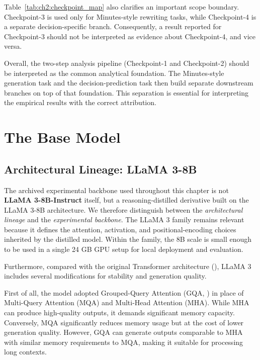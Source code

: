 Table~\ref{tab:ch2:checkpoint_map} also clarifies an important scope boundary. Checkpoint-3 is used only for Minutes-style rewriting tasks, while Checkpoint-4 is a separate decision-specific branch. Consequently, a result reported for Checkpoint-3 should not be interpreted as evidence about Checkpoint-4, and vice versa.

Overall, the two-step analysis pipeline (Checkpoint-1 and Checkpoint-2) should be interpreted as the common analytical foundation. The Minutes-style generation task and the decision-prediction task then build separate downstream branches on top of that foundation. This separation is essential for interpreting the empirical results with the correct attribution.








\section{The Base Model}\label{ch2:sec:base_model}



\subsection*{Architectural Lineage: LLaMA 3-8B}
The archived experimental backbone used throughout this chapter is not \textbf{LLaMA 3-8B-Instruct} itself, but a reasoning-distilled derivative built on the LLaMA 3-8B architecture. We therefore distinguish between the \textit{architectural lineage} and the \textit{experimental backbone}. The LLaMA 3 family remains relevant because it defines the attention, activation, and positional-encoding choices inherited by the distilled model. Within the family, the 8B scale is small enough to be used in a single 24 GB GPU setup for local deployment and evaluation.


Furthermore, compared with the original Transformer architecture (\cite{vaswani-etal2018}), LLaMA 3 includes several modifications for stability and generation quality.

First of all, the model adopted Grouped-Query Attention (GQA, \cite{ainslie2023gqa}) in place of Multi-Query Attention (MQA) and Multi-Head Attention (MHA). While MHA can produce high-quality outputs, it demands significant memory capacity. Conversely, MQA significantly reduces memory usage but at the cost of lower generation quality. However, GQA can generate outputs comparable to MHA with similar memory requirements to MQA, making it suitable for processing long contexts.

